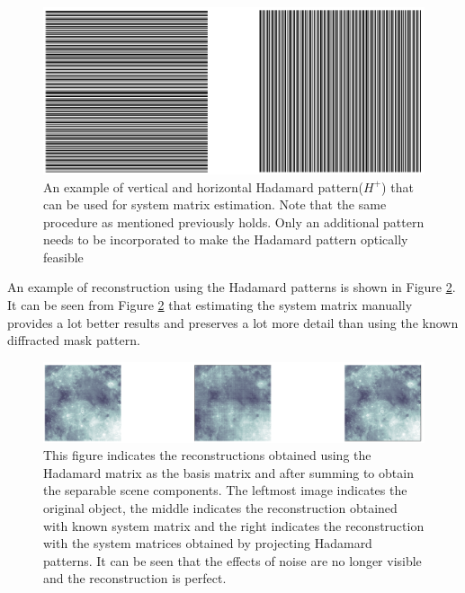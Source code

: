\begin{figure}[h]
\centering
\includegraphics[width = \linewidth]{pics/hadamard_ex.png}
\caption{An example of vertical and horizontal Hadamard pattern($H^+$) that can be used for system matrix estimation. Note that the same procedure as mentioned previously holds. Only an additional pattern needs to be incorporated to make the Hadamard pattern optically feasible }
\label{fig:hadamrd_ex}
\end{figure}
An example of reconstruction using the Hadamard patterns is shown in Figure \ref{fig:hadamrd_rec}. It can be seen from Figure \ref{fig:hadamrd_rec} that estimating the system matrix manually provides a lot better results and preserves a lot more detail than using the known diffracted mask pattern. 
\begin{figure}[h]
\centering
\includegraphics[width = \linewidth]{pics/hadamard_rec.png}
\caption{This figure indicates the reconstructions obtained using the Hadamard matrix as the basis matrix and after summing to obtain the separable scene components. The leftmost image indicates the original object, the middle indicates the reconstruction obtained with known system matrix and the right indicates the reconstruction with the system matrices obtained by projecting Hadamard patterns. It can be seen that the effects of noise are no longer visible and the reconstruction is perfect. }
\label{fig:hadamrd_rec}
\end{figure}

